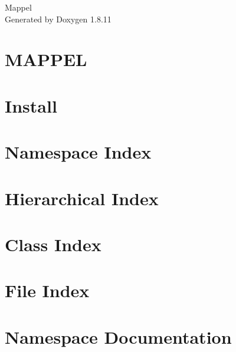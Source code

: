 \documentclass[twoside]{article}
\newcommand{\+}{\discretionary{\mbox{\scriptsize$\hookleftarrow$}}{}{}}
\begin{document}
\hypersetup{pageanchor=false,
             bookmarksnumbered=true,
             pdfencoding=unicode
            }
\begin{titlepage}
\vspace*{7cm}
\begin{center}%
{\Large Mappel }\\
\vspace*{1cm}
{\large Generated by Doxygen 1.8.11}\\
\end{center}
\end{titlepage}
\tableofcontents
{}
\hypersetup{pageanchor=true}

\section{M\+A\+P\+P\+EL}
\label{index}\hypertarget{index}{}
\section{Install}
\label{Install}
\hypertarget{Install}{}

\section{Namespace Index}

\section{Hierarchical Index}

\section{Class Index}

\section{File Index}

\section{Namespace Documentation}












\end{document}
